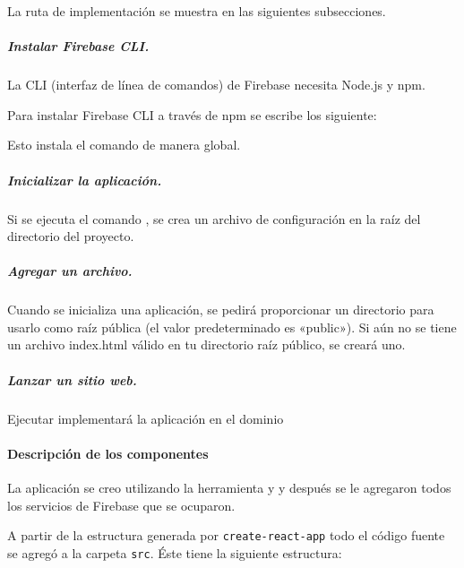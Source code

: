La ruta de implementación se muestra en las siguientes subsecciones.


\subparagraph{Instalar Firebase CLI.}
\label{\detokenize{firebase_web:instalar-firebase-cli}}
La CLI (interfaz de línea de comandos) de Firebase necesita Node.js y npm.

Para instalar Firebase CLI a través de npm se escribe los siguiente:

%
\begin{sphinxVerbatim}[commandchars=\\\{\}]
   
\end{sphinxVerbatim}

Esto instala el comando  de manera global.


\subparagraph{Inicializar la aplicación.}
\label{\detokenize{firebase_web:inicializar-la-aplicacion}}
Si se ejecuta el comando , se crea un archivo de configuración
 en la raíz del directorio del proyecto.


\subparagraph{Agregar un archivo.}
\label{\detokenize{firebase_web:agregar-un-archivo}}
Cuando se inicializa una aplicación, se pedirá proporcionar un directorio para
usarlo como raíz pública (el valor predeterminado es «public»). Si aún no
se tiene un archivo index.html válido en tu directorio raíz público, se creará
uno.


\subparagraph{Lanzar un sitio web.}
\label{\detokenize{firebase_web:implementar-un-sitio-web}}
Ejecutar  implementará la aplicación en el dominio


\paragraph{Descripción de los componentes}
\label{\detokenize{code_docs:creacion-del-proyecto}}

La aplicación se creo utilizando la herramienta
 y 
y después se le agregaron todos los servicios de Firebase
que se ocuparon. 

A partir de la estructura generada por \texttt{create-react-app}
todo el código fuente se agregó a la carpeta
\texttt{src}. Éste tiene la siguiente estructura:


